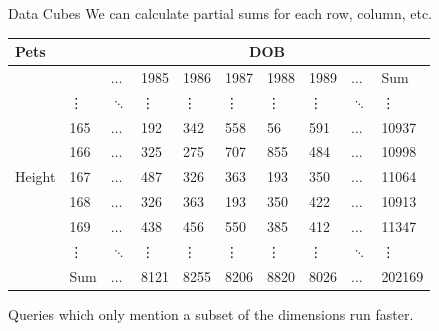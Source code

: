 \documentclass{beamer}
\theoremstyle{definition}
\theoremstyle{definition}
\begin{document}
\begin{frame}{Data Cubes}
    We can calculate partial sums for each row, column, etc.\cite{Gray96}
    \begin{table}[h]\footnotesize
        \begin{tabular} { | l | l | l | l | l | l | l | l | l | l |}
        \hline
        \textbf{Pets} & & \multicolumn{8}{|c|}{DOB} \\ \hline
        & & $\hdots$ & 1985 & 1986 & 1987 & 1988 & 1989 & $\hdots$ & Sum \\ \hline
        \multirow{7}{*}{Height}
        & \vdots & $\ddots$ & \vdots & \vdots & \vdots & \vdots & \vdots & $\ddots$ & \vdots \\
        & 165 & $\hdots$ & 192 & 342 & 558 & 56 & 591 & $\hdots$ & 10937 \\
        & 166 & $\hdots$ & 325 & 275 & 707 & 855 & 484 & $\hdots$ & 10998 \\
        & 167 & $\hdots$ & 487 & 326 & 363 & 193 & 350 & $\hdots$ & 11064 \\
        & 168 & $\hdots$ & 326 & 363 & 193 & 350 & 422 & $\hdots$ & 10913 \\
        & 169 & $\hdots$ & 438 & 456 & 550 & 385 & 412 & $\hdots$ & 11347 \\
        & \vdots & $\ddots$ & \vdots & \vdots & \vdots & \vdots & \vdots & $\ddots$ & \vdots \\
        & Sum & $\hdots$ & 8121 & 8255 & 8206 & 8820 & 8026 & $\hdots$ & 202169 \\
        \hline
        \end{tabular}
    \end{table}
    \pause
    Queries which only mention a subset of the dimensions run faster.
\end{frame}
\end{document}
